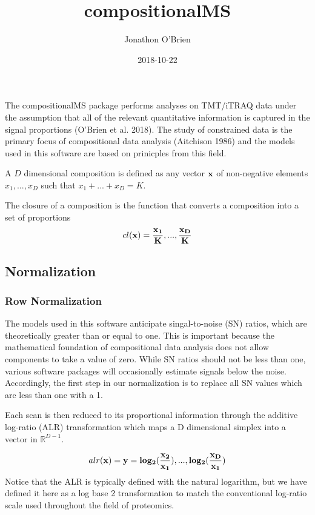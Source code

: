 \documentclass[]{article}
\title{compositionalMS}
\author{Jonathon O'Brien}
\date{2018-10-22}
\begin{document}
\maketitle

The compositionalMS package performs analyses on TMT/iTRAQ data under
the assumption that all of the relevant quantitative information is
captured in the signal proportions (O'Brien et al. 2018). The study of
constrained data is the primary focus of compositional data analysis
(Aitchison 1986) and the models used in this software are based on
prinicples from this field.

A \(D\) dimensional composition is defined as any vector \(\bf{x}\) of
non-negative elements \(x_{1}, ..., x_{D}\) such that
\(x_{1} + ... + x_{D} = K\).

The closure of a composition is the function that converts a composition
into a set of proportions \[
cl(\bf{x}) = \frac{x_{1}}{K}, ..., \frac{x_{D}}{K}
\]

\subsection{Normalization}\label{normalization}

\subsubsection{Row Normalization}\label{row-normalization}

The models used in this software anticipate singal-to-noise (SN) ratios,
which are theoretically greater than or equal to one. This is important
because the mathematical foundation of compositional data analysis does
not allow components to take a value of zero. While SN ratios should not
be less than one, various software packages will occasionally estimate
signals below the noise. Accordingly, the first step in our
normalization is to replace all SN values which are less than one with a
1.

Each scan is then reduced to its proportional information through the
additive log-ratio (ALR) transformation which maps a D dimensional
simplex into a vector in \(\mathbb{R}^{D-1}\).

\[
alr(\bf{x}) = \bf{y} = log_2(\frac{x_{2}}{x_{1}}), ..., log_2(\frac{x_{D}}{x_{1}})
\] Notice that the ALR is typically defined with the natural logarithm,
but we have defined it here as a log base 2 transformation to match the
conventional log-ratio scale used throughout the field of proteomics.
\end{document}
